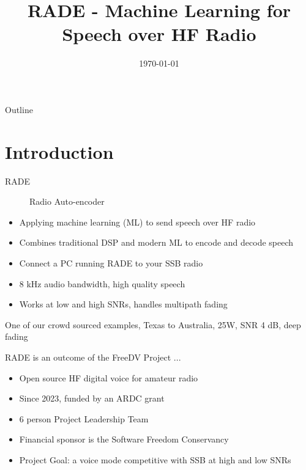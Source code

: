 \documentclass{beamer}
\title[RADE]{RADE - Machine Learning for Speech over HF Radio}
\institute[freedv.org]{freedv.org \and Supported by a grant from Amateur Radio Digital Communications}
\date[]{\today}
\begin{document}


\begin{frame}
    \titlepage
\end{frame}

\begin{frame}{Outline}
    \tableofcontents
\end{frame}

\section{Introduction}

\begin{frame}
\begin{description}
    \item[RADE] Radio Auto-encoder
\end{description}
\begin{itemize}
   \item Applying machine learning (ML) to send speech over HF radio 
   \item Combines traditional DSP and modern ML to encode and decode speech
   \item Connect a PC running RADE to your SSB radio
   \item 8 kHz audio bandwidth, high quality speech
   \item Works at low and high SNRs, handles multipath fading
\end{itemize}
\end{frame}

\begin{frame}
One of our crowd sourced examples, Texas to Australia, 25W, SNR 4 dB, deep fading
\href{http://freedv.org/davids-freedv-update-september-2024/}{}
\end{frame}

\begin{frame}
RADE is an outcome of the FreeDV Project ...
\begin{itemize}
    \item Open source HF digital voice for amateur radio
    \item Since 2023, funded by an ARDC grant
    \item 6 person Project Leadership Team
    \item Financial sponsor is the Software Freedom Conservancy
    \item Project Goal: a voice mode competitive with SSB at high and low SNRs
\end{itemize}
\end{frame}
\end{document}
